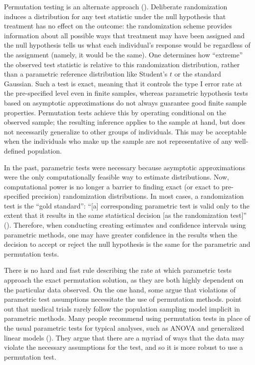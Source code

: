 \documentclass[12pt]{article}
\begin{document}
Permutation testing is an alternate approach (\cite{fisher_design_1935, pitman_significance_1937,pitman_significance_1938}).
Deliberate randomization induces a distribution for any test statistic under the null hypothesis that treatment has no effect on the outcome:
the randomization scheme provides information about all possible ways that treatment may have been assigned 
and the null hypothesis tells us what each individual's response would be regardless of the assignment (namely, it would be the same).
One determines how ``extreme'' the observed test statistic is relative to this randomization distribution, rather than a parametric reference distribution like Student's $t$ or the standard Gaussian.
Such a test is exact, meaning that it controls the type I error rate at the pre-specified level even in finite samples, whereas parametric hypothesis tests based on asymptotic approximations do not always guarantee good finite sample properties.
Permutation tests achieve this by operating conditional on the observed sample; the resulting inference applies to the sample at hand, but does not necessarily generalize to other groups of individuals.
This may be acceptable when the individuals who make up the sample are not representative of any well-defined population.

In the past, parametric tests were necessary because asymptotic approximations were the only computationally feasible way to estimate distributions. 
Now, computational power is no longer a barrier to finding exact (or exact to pre-specified precision) randomization distributions.
In most cases, a randomization test is the ``gold standard'':
``[a] corresponding parametric test is valid only to the extent that it results in the same statistical decision [as the randomization test]'' (\cite{bradley_distribution_1968}).
Therefore, when conducting creating estimates and confidence intervals using parametric methods, one may have greater confidence in the results when the decision to accept or reject the null hypothesis is the same for the parametric and permutation tests.

There is no hard and fast rule describing the rate at which parametric tests approach the exact permutation solution, as they are both highly dependent on the particular data observed.
On the one hand, some argue that violations of parametric test assumptions necessitate the use of permutation methods.
\cite{ludbrook_why_1998} point out that medical trials rarely follow the population sampling model implicit in parametric methods.
Many people recommend using permutation tests in place of the usual parametric tests for typical analyses, such as ANOVA and generalized linear models (\cite{still_approximate_1981, winkler_permutation_2014}).
They argue that there are a myriad of ways that the data may violate the necessary assumptions for the test, and so it is more robust to use a permutation test.
\end{document}

